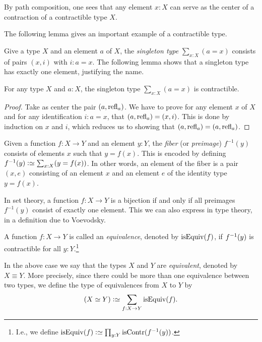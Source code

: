 By path composition, one sees that any element $x : X$ can serve as the center of a contraction of a contractible type $X$.

The following lemma gives an important example of a contractible type.

Give a type $X$ and an element $a$ of $X$,
the \emph{singleton type} $\sum_{x:X} (a=x)$
consists of pairs $(x,i)$ with $i: a=x$. The following lemma shows that a singleton type has exactly one element, justifying the name.

\begin{lemma}\label{lem:thepathspaceiscontractible}
For any type $X$ and $a:X$, the singleton type $\sum_{x:X} (a=x)$ is contractible.
\end{lemma}

\begin{proof}
Take as center the pair $(a,\mathrm{refl}_{a})$. We have
to prove for any element $x$ of $X$ and for any identification
$i: a=x$, that $(a,\mathrm{refl}_{a}) = (x,i)$.  This is done by induction on $x$ and $i$, which reduces us to showing
that $(a,\mathrm{refl}_{a}) = (a,\mathrm{refl}_{a})$.
\end{proof}

\begin{definition}
\label{def:fiber}
Given a function $f : X \to Y$ and an element $y:Y$,
the \emph{fiber} (or \emph{preimage}) $f^{-1}(y)$ consists
of elements $x$ such that $y = f(x)$.
This is encoded by defining $f^{-1}(y) \defeq \sum_{x:X}(y = f(x))$.
In other words, an element of the fiber is a pair $(x,e)$ consisting
of an element $x$ and an element $e$ of the identity type $y = f(x)$.
\end{definition}

In set theory, a function $f : X \to Y$ is a bijection if and only if
all preimages $f^{-1}(y)$ consist of exactly one element.
This we can also express in type theory, in a definition due
to Voevodsky.

\begin{definition}
  \label{def:equivalence}
  A function $f : X \to Y$ is called an \emph{equivalence},
  denoted by $\isEq(f)$, if $f^{-1}(y)$ is contractible for
  all $y:Y$.\footnote{%
    I.e., we define $\isEq(f) \defeq \prod_{y:Y}\iscontr(f^{-1}(y))$.}
\end{definition}

In the above case we say that the types
$X$ and $Y$ are \emph{equivalent}, denoted by $X\equiv Y$.
More precisely, since there could be more than one equivalence
between two types, we define the type of equivalences from $X$ to $Y$ by
\[
  (X\equiv Y) \defeq \sum_{f:X\to Y} \isEq(f).
\]

